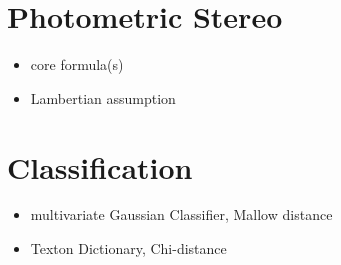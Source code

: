 \section{Photometric Stereo}\label{PhotometricStereo}

\begin{itemize}
	\item{core formula(s)}
	\item{Lambertian assumption}
\end{itemize}


\section{Classification}
\begin{itemize}
	\item{multivariate Gaussian Classifier, Mallow distance}
	\item{Texton Dictionary, Chi-distance}
\end{itemize}

